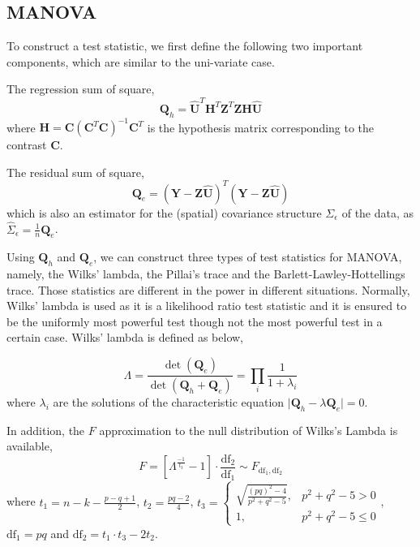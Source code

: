 \documentclass[english]{article}\usepackage[]{graphicx}\usepackage[]{color}
\begin{document}
\subsection{MANOVA\label{sub:MANOVA}}

To construct a test statistic, we first define the following two important
components, which are similar to the uni-variate case.

The regression sum of square, 
\begin{equation}
\boldsymbol{Q}_{h}=\hat{\boldsymbol{U}}^{T}\boldsymbol{H}^{T}\boldsymbol{Z}^{T}\boldsymbol{Z}\boldsymbol{H}\hat{\boldsymbol{U}}\label{eq:MANOVAQh}
\end{equation}
where $\boldsymbol{H}=\boldsymbol{C}\left(\boldsymbol{C}^{T}\boldsymbol{C}\right)^{-1}\boldsymbol{C}^{T}$
is the hypothesis matrix corresponding to the contrast $\boldsymbol{C}$.

The residual sum of square,
\begin{equation}
\boldsymbol{Q}_{e}=\left(\boldsymbol{Y}-\boldsymbol{Z}\hat{\boldsymbol{U}}\right)^{T}\left(\boldsymbol{Y}-\boldsymbol{Z}\hat{\boldsymbol{U}}\right)\label{eq:MANOVAQe}
\end{equation}
which is also an estimator for the (spatial) covariance structure
$\Sigma_{\epsilon}$ of the data, as $\hat{\Sigma}_{\epsilon}=\frac{1}{n}\boldsymbol{Q}_{e}$.

Using $\boldsymbol{Q}_{h}$ and $\boldsymbol{Q}_{e}$, we can construct
three types of test statistics for MANOVA, namely, the Wilks' lambda,
the Pillai's trace and the Barlett-Lawley-Hottellings trace. Those
statistics are different in the power in different situations. Normally,
Wilks' lambda is used as it is a likelihood ratio test statistic and
it is ensured to be the uniformly most powerful test though not the
most powerful test in a certain case. Wilks' lambda is defined as
below,

\begin{equation}
\Lambda=\frac{\det\left(\boldsymbol{Q}_{e}\right)}{\det\left(\boldsymbol{Q}_{h}+\boldsymbol{Q}_{e}\right)}=\prod_{i}\frac{1}{1+\lambda_{i}}
\end{equation}
where $\lambda_{i}$ are the solutions of the characteristic equation
$\mid\boldsymbol{Q}_{h}-\lambda\boldsymbol{Q}_{e}\mid=0$.

In addition, the $F$ approximation \cite{rao1951asymptotic} to the
null distribution of Wilks's Lambda is available, 
\[
F=\left[\Lambda^{\frac{-1}{t_{3}}}-1\right]\cdot\frac{\text{df}_{2}}{\text{df}_{1}}\sim F_{\text{df}_{1},\text{df}_{2}}
\]
where $t_{1}=n-k-\frac{p-q+1}{2}$, $t_{2}=\frac{pq-2}{4}$, $t_{3}=\begin{cases}
\sqrt{\frac{\left(pq\right)^{2}-4}{p^{2}+q^{2}-5}}, & p^{2}+q^{2}-5>0\\
1, & p^{2}+q^{2}-5\le0
\end{cases}$, $\text{df}_{1}=pq$ and $\text{df}_{2}=t_{1}\cdot t_{3}-2t_{2}$. 
\end{document}
